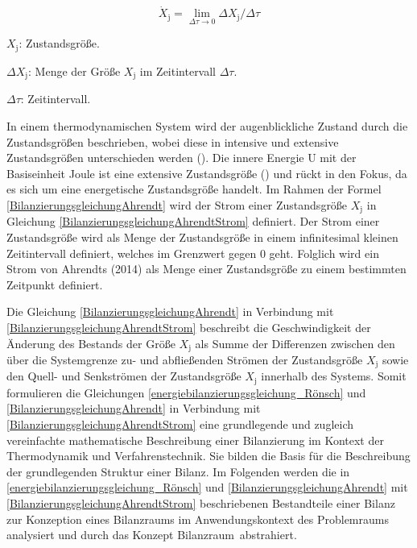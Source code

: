 \begin{equation}
    \dot{X}_{\text{j}} = \lim_{\Delta\tau \to 0} \Delta X_{\text{j}}/ \Delta\tau
    \label{BilanzierungsgleichungAhrendtStrom}
\end{equation}

\begin{description}
    \item \(X_{\text{j}}\): Zustandsgröße.
    \item \(\Delta X_{\text{j}}\): Menge der Größe \(X_{\text{j}}\) im Zeitintervall \(\Delta \tau\).
    \item \(\Delta \tau\): Zeitintervall.
\end{description}


In einem thermodynamischen System wird der augenblickliche Zustand durch die Zustandsgrößen beschrieben, wobei diese in intensive und extensive Zustandsgrößen unterschieden werden (\cite[S. 66]{Konstantin.2023}). Die innere Energie 
U mit der Basiseinheit Joule ist eine extensive Zustandsgröße (\cite[S. 65]{Konstantin.2023}) und rückt in den Fokus, da es sich um eine energetische Zustandsgröße handelt.
Im Rahmen der Formel \eqref{BilanzierungsgleichungAhrendt} wird der Strom einer Zustandsgröße \(X_{\text{j}}\) in Gleichung \eqref{BilanzierungsgleichungAhrendtStrom} definiert.
Der Strom einer Zustandsgröße wird als Menge der Zustandsgröße in einem infinitesimal kleinen Zeitintervall definiert, welches im Grenzwert gegen 0 geht.
Folglich wird ein Strom von Ahrendts (2014) als Menge einer Zustandsgröße zu einem bestimmten Zeitpunkt definiert.

Die Gleichung \eqref{BilanzierungsgleichungAhrendt} in Verbindung mit \eqref{BilanzierungsgleichungAhrendtStrom} beschreibt die Geschwindigkeit der Änderung des Bestands der Größe
\(X_{\text{j}}\) als Summe der Differenzen zwischen den über die Systemgrenze zu- und abfließenden Strömen der Zustandsgröße
\(X_{\text{j}}\) sowie den Quell- und Senkströmen der Zustandsgröße \(X_{\text{j}}\) innerhalb des Systems.  
Somit formulieren die Gleichungen \eqref{energiebilanzierungsgleichung_Rönsch} und \eqref{BilanzierungsgleichungAhrendt} in Verbindung mit 
\eqref{BilanzierungsgleichungAhrendtStrom} eine grundlegende und zugleich vereinfachte mathematische Beschreibung einer Bilanzierung im Kontext der Thermodynamik und 
Verfahrenstechnik. Sie bilden die Basis für die Beschreibung der grundlegenden Struktur einer Bilanz.
Im Folgenden werden die in \eqref{energiebilanzierungsgleichung_Rönsch} und \eqref{BilanzierungsgleichungAhrendt} mit \eqref{BilanzierungsgleichungAhrendtStrom} 
beschriebenen Bestandteile einer Bilanz zur Konzeption eines Bilanzraums im Anwendungskontext des Problemraums analysiert und durch das Konzept \glqq Bilanzraum\grqq\ abstrahiert.